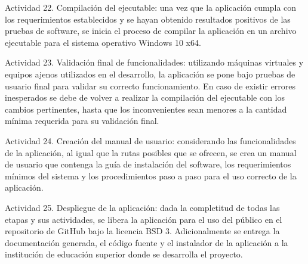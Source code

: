 \begin{APAitemize}
    \item Actividad 22. Compilación del ejecutable: una vez que la aplicación cumpla con los requerimientos establecidos y se hayan obtenido resultados positivos de las pruebas de software, se inicia el proceso de compilar la aplicación en un archivo ejecutable para el sistema operativo Windows 10 x64.
    \item Actividad 23. Validación final de funcionalidades: utilizando máquinas virtuales y equipos ajenos utilizados en el desarrollo, la aplicación se pone bajo pruebas de usuario final para validar su correcto funcionamiento. En caso de existir errores inesperados se debe de volver a realizar la compilación del ejecutable con los cambios pertinentes, hasta que los inconvenientes sean menores a la cantidad mínima requerida para su validación final.
    \item Actividad 24. Creación del manual de usuario: considerando las funcionalidades de la aplicación, al igual que la rutas posibles que se ofrecen, se crea un manual de usuario que contenga la guía de instalación del software, los requerimientos mínimos del sistema y los procedimientos paso a paso para el uso correcto de la aplicación.
    \item Actividad 25. Despliegue de la aplicación: dada la completitud de todas las etapas y sus actividades, se libera la aplicación para el uso del público en el repositorio de GitHub bajo la licencia BSD 3. Adicionalmente se entrega la documentación generada, el código fuente y el instalador de la aplicación a la institución de educación superior donde se desarrolla el proyecto.
\end{APAitemize}


